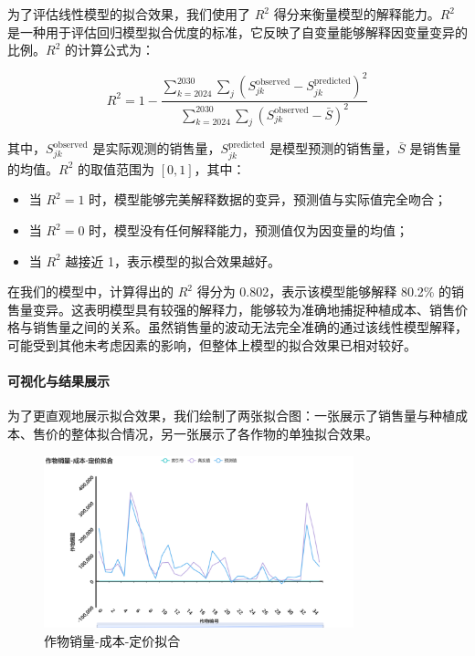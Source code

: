 \documentclass[12pt,a4paper]{nmmcm}
\begin{document}
为了评估线性模型的拟合效果，我们使用了 $R^2$ 得分来衡量模型的解释能力。$R^2$ 是一种用于评估回归模型拟合优度的标准，它反映了自变量能够解释因变量变异的比例。$R^2$ 的计算公式为：

\[
  R^2 = 1 - \frac{\sum_{k=2024}^{2030} \sum_{j} \left( S_{jk}^{\text{observed}} - S_{jk}^{\text{predicted}} \right)^2}{\sum_{k=2024}^{2030} \sum_{j} \left( S_{jk}^{\text{observed}} - \bar{S} \right)^2}
\]

其中，$S_{jk}^{\text{observed}}$ 是实际观测的销售量，$S_{jk}^{\text{predicted}}$ 是模型预测的销售量，$\bar{S}$ 是销售量的均值。$R^2$ 的取值范围为 $[0,1]$，其中：
\begin{itemize}
  \item 当 $R^2 = 1$ 时，模型能够完美解释数据的变异，预测值与实际值完全吻合；
  \item 当 $R^2 = 0$ 时，模型没有任何解释能力，预测值仅为因变量的均值；
  \item 当 $R^2$ 越接近 1，表示模型的拟合效果越好。
\end{itemize}

在我们的模型中，计算得出的 $R^2$ 得分为 0.802，表示该模型能够解释 80.2\% 的销售量变异。这表明模型具有较强的解释力，能够较为准确地捕捉种植成本、销售价格与销售量之间的关系。虽然销售量的波动无法完全准确的通过该线性模型解释，可能受到其他未考虑因素的影响，但整体上模型的拟合效果已相对较好。

\paragraph{可视化与结果展示}

为了更直观地展示拟合效果，我们绘制了两张拟合图：一张展示了销售量与种植成本、售价的整体拟合情况，另一张展示了各作物的单独拟合效果。

\begin{figure}[H]
  \centering
  \includegraphics[width=0.8\textwidth]{figures/prob3/correlation/作物销量-成本-定价拟合.png}
  \caption{作物销量-成本-定价拟合}
  \label{fig:fitting1}
\end{figure}
\end{document}

